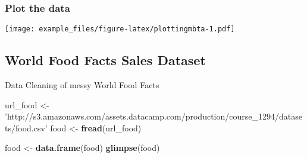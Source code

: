 \documentclass[]{article}
\newenvironment{Shaded}{\begin{snugshade}}{\end{snugshade}}
\newcommand{\DataTypeTok}[1]{\textcolor[rgb]{0.13,0.29,0.53}{#1}}
\newcommand{\DecValTok}[1]{\textcolor[rgb]{0.00,0.00,0.81}{#1}}
\newcommand{\KeywordTok}[1]{\textcolor[rgb]{0.13,0.29,0.53}{\textbf{#1}}}
\newcommand{\NormalTok}[1]{#1}
\newcommand{\OperatorTok}[1]{\textcolor[rgb]{0.81,0.36,0.00}{\textbf{#1}}}
\newcommand{\StringTok}[1]{\textcolor[rgb]{0.31,0.60,0.02}{#1}}
\begin{document}
\hypertarget{plot-the-data}{%
\subsubsection{Plot the data}\label{plot-the-data}}

\begin{Shaded}
\end{Shaded}

\texttt{[image: example\_files/figure-latex/plottingmbta-1.pdf]}

\hypertarget{world-food-facts-sales-dataset}{%
\subsection{World Food Facts Sales
Dataset}\label{world-food-facts-sales-dataset}}

Data Cleaning of messy World Food Facts

\begin{Shaded}
\begin{Highlighting}[]
\NormalTok{url_food <-}\StringTok{ 'http://s3.amazonaws.com/assets.datacamp.com/production/course_1294/datasets/food.csv'}
\NormalTok{food <-}\StringTok{ }\KeywordTok{fread}\NormalTok{(url_food)}

\NormalTok{food <-}\StringTok{ }\KeywordTok{data.frame}\NormalTok{(food)}
\KeywordTok{glimpse}\NormalTok{(food)}
\end{Highlighting}
\end{Shaded}
\end{document}
